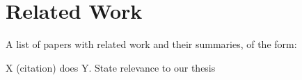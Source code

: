 \chapter{Related Work}


A list of papers with related work and their summaries, of the form:


X (citation) does Y. State relevance to our thesis